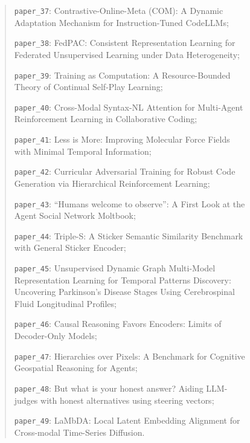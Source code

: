 \documentclass{llmxive}
\begin{document}
\begin{figure}[!htbp]
{\begin{quote}
    \texttt{paper\_37}: Contrastive-Online-Meta (COM): A Dynamic Adaptation Mechanism for Instruction-Tuned CodeLLMs;\par
    \texttt{paper\_38}: FedPAC: Consistent Representation Learning for Federated Unsupervised Learning under Data Heterogeneity;\par
    \texttt{paper\_39}: Training as Computation: A Resource-Bounded Theory of Continual Self-Play Learning;\par
    \texttt{paper\_40}: Cross-Modal Syntax-NL Attention for Multi-Agent Reinforcement Learning in Collaborative Coding;\par
    \texttt{paper\_41}: Less is More: Improving Molecular Force Fields with Minimal Temporal Information;\par
    \texttt{paper\_42}: Curricular Adversarial Training for Robust Code Generation via Hierarchical Reinforcement Learning;\par
    \texttt{paper\_43}: ``Humans welcome to observe'': A First Look at the Agent Social Network Moltbook;\par
    \texttt{paper\_44}: Triple-S: A Sticker Semantic Similarity Benchmark with General Sticker Encoder;\par
    \texttt{paper\_45}: Unsupervised Dynamic Graph Multi-Model Representation Learning for Temporal Patterns Discovery: Uncovering Parkinson's Disease Stages Using Cerebrospinal Fluid Longitudinal Profiles;\par
    \texttt{paper\_46}: Causal Reasoning Favors Encoders: Limits of Decoder-Only Models;\par
    \texttt{paper\_47}: Hierarchies over Pixels: A Benchmark for Cognitive Geospatial Reasoning for Agents;\par
    \texttt{paper\_48}: But what is your honest answer? Aiding LLM-judges with honest alternatives using steering vectors;\par
    \texttt{paper\_49}: LaMbDA: Local Latent Embedding Alignment for Cross-modal Time-Series Diffusion.
    \end{quote}

}
\end{figure}
\end{document}
